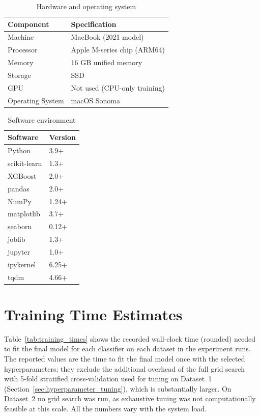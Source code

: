 \begin{table}[H]
\centering
\caption{Hardware and operating system}
\label{tab:hardware}
\begin{tabular}{@{}ll@{}}
\toprule
\textbf{Component} & \textbf{Specification} \\
\midrule
Machine          & MacBook (2021 model) \\
Processor        & Apple M-series chip (ARM64) \\
Memory           & 16 GB unified memory \\
Storage          & SSD \\
GPU              & Not used (CPU-only training) \\
Operating System & macOS Sonoma \\
\bottomrule
\end{tabular}
\end{table}

\begin{table}[H]
\centering
\caption{Software environment}
\label{tab:software}
\begin{tabular}{@{}ll@{}}
\toprule
\textbf{Software} & \textbf{Version} \\
\midrule
Python     & 3.9+ \\
scikit-learn & 1.3+ \\
XGBoost    & 2.0+ \\
pandas     & 2.0+ \\
NumPy      & 1.24+ \\
matplotlib & 3.7+ \\
seaborn    & 0.12+ \\
joblib     & 1.3+ \\
jupyter    & 1.0+ \\
ipykernel  & 6.25+ \\
tqdm       & 4.66+ \\
\bottomrule
\end{tabular}
\end{table}

\section{Training Time Estimates}
\label{app:training_times}

Table~\ref{tab:training_times} shows the recorded wall-clock time (rounded) needed to fit the final model for each classifier on each dataset in the experiment runs. The reported values are the time to fit the final model once with the selected hyperparameters; they exclude the additional overhead of the full grid search with 5-fold stratified cross-validation used for tuning on Dataset~1 (Section~\ref{sec:hyperparameter_tuning}), which is substantially larger. On Dataset~2 no grid search was run, as exhaustive tuning was not computationally feasible at this scale. All the numbers vary with the system load.

